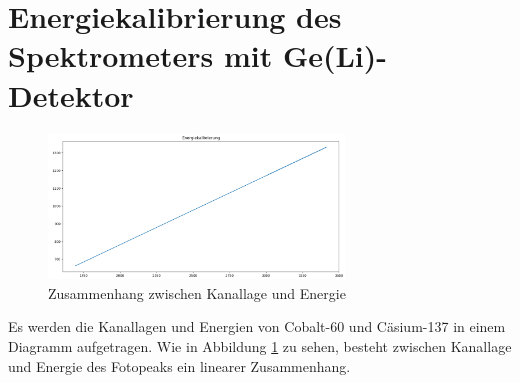 \documentclass[12pt,german]{article}
\begin{document}
    \section{Energiekalibrierung des Spektrometers mit Ge(Li)-Detektor}
    \begin{figure}[H]
        \centering
        \includegraphics[width=0.7\textwidth]{pics/energiekalibrierung.png}
        \caption{Zusammenhang zwischen Kanallage und Energie}
        \label{fig:kanalenergie}
    \end{figure}
    Es werden die Kanallagen und Energien von Cobalt-60 und Cäsium-137 in einem Diagramm aufgetragen.
    Wie in Abbildung \ref{fig:kanalenergie} zu sehen, besteht zwischen Kanallage und  Energie des Fotopeaks ein linearer Zusammenhang.
\end{document}
